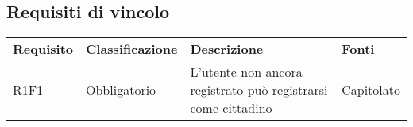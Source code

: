\subsection{Requisiti di vincolo}
\begin{center}
	
	\begin{longtable}{ >{\centering}p{} >{\centering}p{}
			>{\raggedright}p{} >{\centering}p{}}
		
		\rowcolorhead 
		\textbf{\color{white}Requisito} 
		& \textbf{\color{white}Classificazione} 
		& \centering\textbf{\color{white}Descrizione}
		& \textbf{\color{white}Fonti} 
		\tabularnewline 	
		
		R1F1 & Obbligatorio & L'utente non ancora registrato può registrarsi come cittadino 
		& Capitolato
		\tabularnewline
		
		
	\end{longtable}
\end{center}
